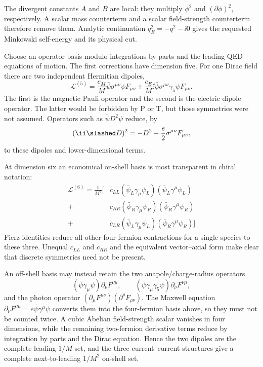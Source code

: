 \begin{enumerate}
The divergent constants \(A\) and \(B\) are local: they multiply
\(\phi^2\) and \((\partial\phi)^2\), respectively.  A scalar mass
counterterm and a scalar field-strength counterterm therefore remove them.
Analytic continuation \(q_E^2=-q^2-\ii0\) gives the requested Minkowski
self-energy and its physical cut.

Choose an operator basis modulo integrations by parts and the leading QED
equations of motion.  The first corrections have dimension five.  For one
Dirac field there are two independent Hermitian dipoles,
\[
 \boxed{\;
 \mathcal L^{(5)}
 =\frac{c_M}{M}\bar\psi\sigma^{\mu\nu}\psi F_{\mu\nu}
 +\frac{c_E}{M}\ii\bar\psi\sigma^{\mu\nu}\gamma_5\psi F_{\mu\nu}.
 \;}
\]
The first is the magnetic Pauli operator and the second is the electric
dipole operator.  The latter would be forbidden by P or T, but those
symmetries were not assumed.  Operators such as
\(\bar\psi D^2\psi\) reduce, by
\[
 (\ii\slashed D)^2=-D^2-\frac{e}{2}\sigma^{\mu\nu}F_{\mu\nu},
\]
to these dipoles and lower-dimensional terms.

At dimension six an economical on-shell basis is most transparent in
chiral notation:
\[
\boxed{\;
\begin{aligned}
 \mathcal L^{(6)}=\frac1{M^2}\bigl[&
 c_{LL}(\bar\psi_L\gamma_\mu\psi_L)
        (\bar\psi_L\gamma^\mu\psi_L)\\
 {}+{}&
 c_{RR}(\bar\psi_R\gamma_\mu\psi_R)
        (\bar\psi_R\gamma^\mu\psi_R)\\
 {}+{}&
 c_{LR}(\bar\psi_L\gamma_\mu\psi_L)
        (\bar\psi_R\gamma^\mu\psi_R)
 \bigr]
\end{aligned}\;}
\]
Fierz identities reduce all other four-fermion contractions for a single
species to these three.  Unequal \(c_{LL}\) and \(c_{RR}\) and the equivalent
vector--axial form make clear that discrete symmetries need not be present.

An off-shell basis may instead retain the two anapole/charge-radius
operators
\[
 (\bar\psi\gamma_\mu\psi)\partial_\nu F^{\nu\mu},
 \qquad
 (\bar\psi\gamma_\mu\gamma_5\psi)\partial_\nu F^{\nu\mu},
\]
and the photon operator
\((\partial_\mu F^{\mu\nu})(\partial^\rho F_{\rho\nu})\).
The Maxwell equation
\(\partial_\nu F^{\nu\mu}=e\bar\psi\gamma^\mu\psi\) converts them into
the four-fermion basis above, so they must not be counted twice.  A cubic
Abelian field-strength scalar vanishes in four dimensions, while the
remaining two-fermion derivative terms reduce by integration by parts and
the Dirac equation.  Hence the two dipoles are the complete leading
\(1/M\) set, and the three current--current structures give a complete
next-to-leading \(1/M^2\) on-shell set.
\end{enumerate}

